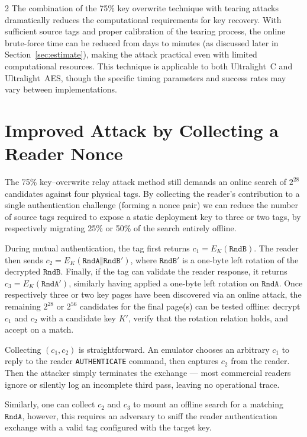 \documentclass[10pt,letterpaper]{article}
\begin{document}
\begin{multicols}{2}
The combination of the 75\% key overwrite technique with tearing attacks dramatically reduces the computational requirements for key recovery. With sufficient source tags and proper calibration of the tearing process, the online brute-force time can be reduced from days to minutes (as discussed later in Section~\ref{sec:estimate}), making the attack practical even with limited computational resources. This technique is applicable to both Ultralight~C and Ultralight~AES, though the specific timing parameters and success rates may vary between implementations.

\section{Improved Attack by Collecting a Reader Nonce}
\label{sec:readernonces}
The 75\% key–overwrite relay attack method still demands an online search of $2^{28}$ candidates against four physical tags. By collecting the reader's contribution to a single authentication challenge (forming a nonce pair) we can reduce the number of source tags required to expose a static deployment key to three or two tags, by respectively migrating 25\% or 50\% of the search entirely offline.

During mutual authentication, the tag first returns $c_{1}=E_{K}(\mathtt{RndB})$. The reader then sends $c_{2}=E_{K}(\mathtt{RndA}\Vert\mathtt{RndB}')$, where $\mathtt{RndB}'$ is a one-byte left rotation of the decrypted $\mathtt{RndB}$. Finally, if the tag can validate the reader response, it returns  $c_{3}=E_{K}(\mathtt{RndA}')$, similarly having applied a one-byte left rotation on $\mathtt{RndA}$. Once respectively three or two key pages have been discovered via an online attack, the remaining $2^{28}$ or $2^{56}$ candidates for the final page(s) can be tested offline: decrypt $c_{1}$ and $c_{2}$ with a candidate key $K'$, verify that the rotation relation holds, and accept on a match.

Collecting $(c_{1},c_{2})$ is straightforward. An emulator chooses an arbitrary $c_{1}$ to reply to the reader \texttt{AUTHENTICATE} command, then captures $c_{2}$ from the reader. Then the attacker simply terminates the exchange --- most commercial readers ignore or silently log an incomplete third pass, leaving no operational trace.

Similarly, one can collect $c_2$ and $c_3$ to mount an offline search for a matching $\mathtt{RndA}$, however, this requires an adversary to sniff the reader authentication exchange with a valid tag configured with the target key.


\end{multicols}
\end{document}
